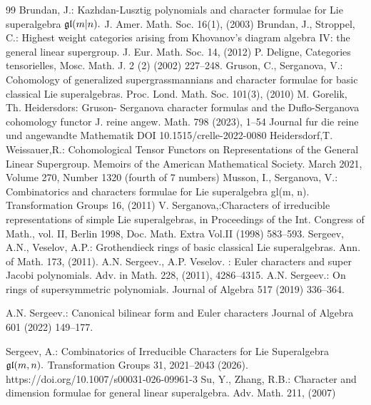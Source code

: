 \documentclass[12pt,reqno]{amsart}
\begin{document}
\begin{thebibliography}{99}
Brundan, J.: Kazhdan-Lusztig polynomials and character formulae for Lie superalgebra $\frak{gl}(m|n).$
J. Amer. Math. Soc. 16(1), (2003)
Brundan, J., Stroppel, C.: Highest weight categories arising from Khovanov's diagram algebra IV:
the general linear supergroup. J. Eur. Math. Soc. 14, (2012)
P. Deligne, Categories tensorielles, Mosc. Math. J. 2 (2) (2002) 227--248.
Gruson, C., Serganova, V.: Cohomology of generalized supergrassmannians and character formulae for basic classical Lie superalgebras. Proc. Lond. Math. Soc. 101(3), (2010)
M. Gorelik, Th. Heidersdors:
Gruson- Serganova character  formulas and the Duflo-Serganova  cohomology functor J. reine angew. Math. 798 (2023), 1--54 Journal fur die reine und angewandte Mathematik DOI 10.1515/crelle-2022-0080
Heidersdorf,T. Weissauer,R.: Cohomological Tensor Functors on Representations of the General Linear Supergroup. Memoirs of the American Mathematical Society. March 2021, Volume 270,  Number 1320 (fourth of 7 numbers)
Musson, I., Serganova, V.: Combinatorics and characters formulae for Lie superalgebra gl(m, n). Transformation Groups 16, (2011)
V. Serganova,:Characters of irreducible representations of simple Lie superalgebras, in Proceedings of the Int. Congress of Math., vol. II, Berlin 1998, Doc. Math. Extra Vol.II (1998) 583--593.
Sergeev, A.N., Veselov, A.P.: Grothendieck rings of basic classical Lie superalgebras. Ann. of Math. 173, (2011).
 A.N. Sergeev., A.P. Veselov. : Euler characters and super Jacobi polynomials.  Adv. in Math. 228, (2011), 4286--4315.
A.N. Sergeev.: On rings of supersymmetric polynomials. Journal of Algebra 517 (2019) 336--364.

A.N. Sergeev.: Canonical bilinear form and Euler characters Journal of Algebra 601 (2022) 149--177.

Sergeev, A.: Combinatorics of Irreducible Characters for Lie Superalgebra $\frak{gl}(m,n).$
 Transformation Groups 31, 2021--2043 (2026). https://doi.org/10.1007/s00031-026-09961-3
  Su, Y., Zhang, R.B.: Character and dimension formulae for general linear superalgebra. Adv. Math.
211, (2007)
\end{thebibliography}
\end{document}
